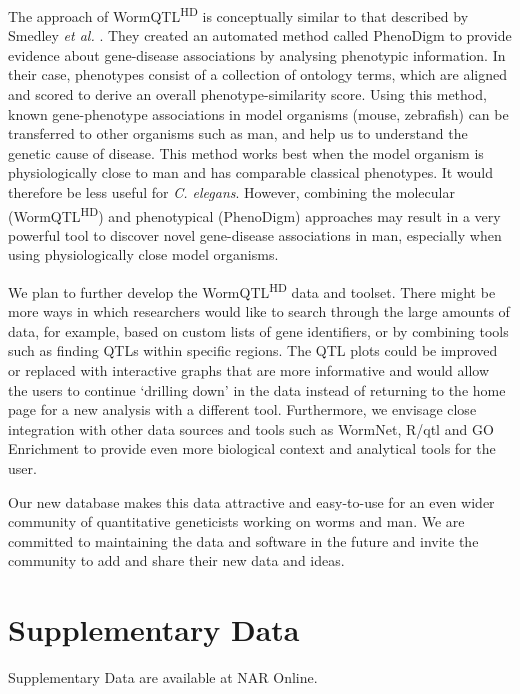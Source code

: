 The approach of WormQTL\textsuperscript{HD} is conceptually similar to that described by Smedley \textsl{et al.} \cite{Smedley_2013}.
They created an automated method called PhenoDigm to provide evidence about gene-disease associations by analysing phenotypic information. In their case, phenotypes consist of a collection of ontology terms, which are aligned and scored to derive an overall phenotype-similarity score.
Using this method, known gene-phenotype associations in model organisms (mouse, zebrafish) can be transferred to other organisms such as man, and help us to understand the genetic cause of disease.
This method works best when the model organism is physiologically close to man and has comparable classical phenotypes. It would therefore be less useful for \textsl{C. elegans}.
However, combining the molecular (WormQTL\textsuperscript{HD}) and phenotypical (PhenoDigm) approaches may result in a very powerful tool to discover novel gene-disease associations in man, especially when using physiologically close model organisms.

We plan to further develop the WormQTL\textsuperscript{HD} data and toolset.
There might be more ways in which researchers would like to search through the large amounts of data, for example, based on custom lists of gene identifiers, or by combining tools such as finding QTLs within specific regions.
The QTL plots could be improved or replaced with interactive graphs that are more informative and would allow the users to continue ‘drilling down’ in the data instead of returning to the home page for a new analysis with a different tool.
Furthermore, we envisage close integration with other data sources and tools such as WormNet, R/qtl and GO Enrichment to provide even more biological context and analytical tools for the user.

Our new database makes this data attractive and easy-to-use for an even wider community of quantitative geneticists working on worms and man.
We are committed to maintaining the data and software in the future and invite the community to add and share their new data and ideas.

\section*{Supplementary Data}
Supplementary Data are available at NAR Online.

